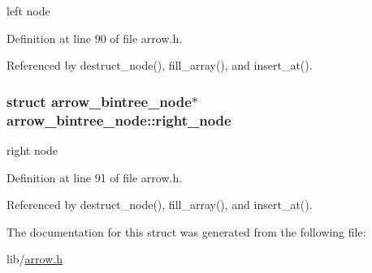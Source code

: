 left node 

Definition at line 90 of file arrow.h.

Referenced by destruct\_\-node(), fill\_\-array(), and insert\_\-at().\hypertarget{structarrow__bintree__node_4875801983f2b0220212951e6c0130af}{
\subsubsection{\setlength{\rightskip}{0pt plus 5cm}struct {\bf arrow\_\-bintree\_\-node}$\ast$ {\bf arrow\_\-bintree\_\-node::right\_\-node}}}
\label{structarrow__bintree__node_4875801983f2b0220212951e6c0130af}


right node 

Definition at line 91 of file arrow.h.

Referenced by destruct\_\-node(), fill\_\-array(), and insert\_\-at().

The documentation for this struct was generated from the following file:\begin{CompactItemize}
\item 
lib/\hyperlink{arrow_8h}{arrow.h}\end{CompactItemize}
